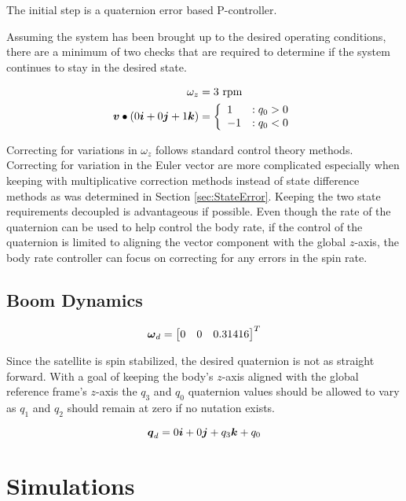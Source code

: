 The initial step is a quaternion error based P-controller.


Assuming the system has been brought up to the desired operating conditions, there are a minimum of two checks that are required to determine if the system continues to stay in the desired state.

\begin{equation}
  \begin{aligned}
    \omega_z &= 3 \text{ rpm} \\
    \boldsymbol{v} \bullet (0\boldsymbol{i}+0\boldsymbol{j}+1\boldsymbol{k}) &= \left\{ \begin{array}{lr} 1 & : q_0 > 0 \\ -1 & : q_0 < 0 \end{array} \right.
  \end{aligned}
  \label{}
\end{equation}

Correcting for variations in $\omega_z$ follows standard control theory methods.  Correcting for variation in the Euler vector are more complicated especially when keeping with multiplicative correction methods instead of state difference methods as was determined in Section \ref{sec:StateError}.  Keeping the two state requirements decoupled is advantageous if possible.  Even though the rate of the quaternion can be used to help control the body rate, if the control of the quaternion is limited to aligning the vector component with the global $z$-axis, the body rate controller can focus on correcting for any errors in the spin rate.


\subsection{Boom Dynamics}
\label{subsec:Boom Dynamics}








\begin{equation}
  \boldsymbol{\omega}_d = \begin{bmatrix} 0 & 0 & 0.31416 \end{bmatrix}^T
  \label{eqn:DesiredBodyRate}
\end{equation}

Since the satellite is spin stabilized, the desired quaternion is not as straight forward.  With a goal of keeping the body's $z$-axis aligned with the global reference frame's $z$-axis the $q_3$ and $q_0$ quaternion values should be allowed to vary as $q_1$ and $q_2$ should remain at zero if no nutation exists.

\begin{equation}
  \boldsymbol{q}_d = 0 \boldsymbol{i} + 0 \boldsymbol{j} + q_3 \boldsymbol{k} + q_0
  \label{eqn:DesiredQuaternion}
\end{equation}



\section{Simulations}
\label{sec:Simulations}

